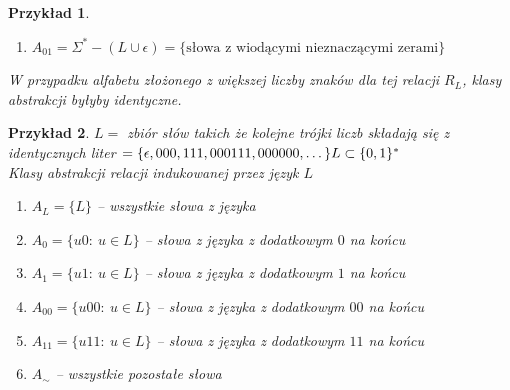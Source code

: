 \documentclass[12pt,a4paper]{article}
\newtheorem{przyklad}{Przykład}
\theoremstyle{definition}
\begin{document}
\begin{przyklad}
\begin{enumerate}
				\begin{itemize}
					\item Każdy element jest w relacji z elementem z klasy
					\begin{proof}
						Niech $u, v \in A_{10}$ wówczas $u = 1\dots$ i $v = 1\dots$. Dla $z \in \Sigma^* \quad uz = 1\dots$ i $vz = 1\dots$
						stąd $uz \in L$ i $vz \in L$
					\end{proof}
					\item Każdy element nie jest w relacji z elementem nie należącym do $A_{10}$
					\begin{proof}
						Niech $u \in A_{10}$ i $v \not\in A_{10}$ wówczas $u = 1\dots$ 
						\begin{itemize}
							\item jeśli $v\ \neq \epsilon$ to znaczy $v = 0\dots $, wówczas dla $z = 1 \quad uz \in L \wedge vz \not\in L$
							\item jeśli $v = \epsilon$ to dla $z = \epsilon \quad uz \in L \wedge vz \not\in L$
							\footnote{Można skorzystać z tego że już udowodniliśmy że $\epsilon$ jest w innej klasie abstrakcji}
						\end{itemize}
					\end{proof}
				\end{itemize}
			\item $A_{01} = \Sigma^* - (L \cup {\epsilon}) = \{ \text{słowa z wiodącymi nieznaczącymi zerami} \}$
		\end{enumerate}
		W przypadku alfabetu złożonego z większej liczby znaków dla tej relacji $R_L$, klasy abstrakcji byłyby identyczne.
	\end{przyklad}	
	
	\begin{przyklad}
		$L = $ zbiór słów takich że kolejne trójki liczb składają się z identycznych liter $ = \{\epsilon, 000, 111, 000111, 000000, \dots\}\\
		L \subset \{0, 1\}^*$\\
		Klasy abstrakcji relacji indukowanej przez język $L$
		\begin{enumerate}
			\item $A_L = \{L\}$ -- wszystkie słowa z języka
			\item $A_0 = \{u0: ~ u\in L\}$ -- słowa z języka z dodatkowym $0$ na końcu
			\item $A_1 = \{u1: ~ u\in L\}$ -- słowa z języka z dodatkowym $1$ na końcu
			\item $A_{00} = \{u00: ~ u\in L\}$ -- słowa z języka z dodatkowym $00$ na końcu
			\item $A_{11} = \{u11: ~ u\in L\}$ -- słowa z języka z dodatkowym $11$ na końcu
			\item $A_\sim$ -- wszystkie pozostałe słowa
		\end{enumerate}
	\end{przyklad}		
	
\end{document}
